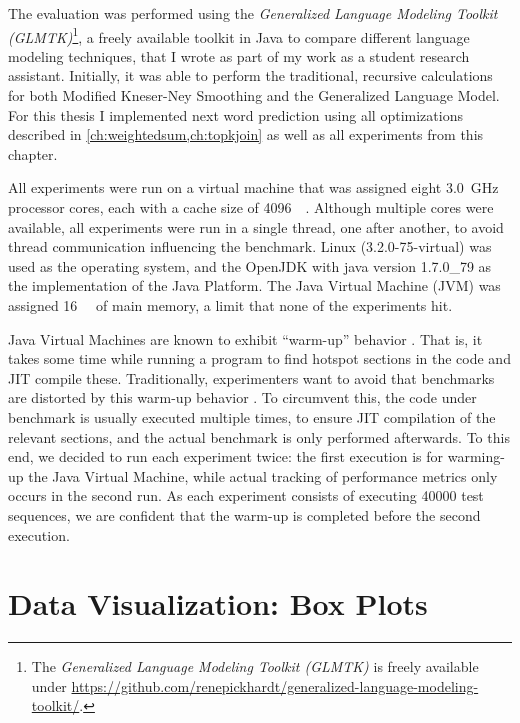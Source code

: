 The evaluation was performed using the \emph{Generalized Language Modeling
Toolkit (GLMTK)}\footnote{The \emph{Generalized Language Modeling Toolkit
(GLMTK)} is freely available under
\mbox{\url{https://github.com/renepickhardt/generalized-language-modeling-toolkit/}}.},
a freely available toolkit in Java to compare different language modeling
techniques, that I wrote as part of my work as a student research assistant.
Initially, it was able to perform the traditional, recursive calculations for
both Modified Kneser-Ney Smoothing and the Generalized Language Model.
For this thesis I implemented next word prediction using all optimizations
described in \cref{ch:weightedsum,ch:topkjoin} as well as all experiments from
this chapter.

All experiments were run on a virtual machine that was assigned eight
\SI{3.0}{\giga\hertz} processor cores, each with a cache size of
\SI{4096}{\kibi\byte}.
Although multiple cores were available, all experiments were run in a single
thread, one after another, to avoid thread communication influencing the
benchmark.
Linux (3.2.0-75-virtual) was used as the operating system, and
the OpenJDK with java version 1.7.0\_79 as the implementation of the
Java Platform.
The Java Virtual Machine (JVM) was assigned \SI{16}{\gibi\byte} of main memory,
a limit that none of the experiments hit.

Java Virtual Machines are known to exhibit \enquote{warm-up} behavior \noref.
That is, it takes some time while running a program to find hotspot sections
in the code and JIT compile these.
Traditionally, experimenters want to avoid that benchmarks are distorted by
this warm-up behavior \noref.
To circumvent this, the code under benchmark is usually executed multiple times,
to ensure JIT compilation of the relevant sections, and the actual benchmark
is only performed afterwards.
To this end, we decided to run each experiment twice:
the first execution is for warming-up the Java Virtual Machine, while actual
tracking of performance metrics only occurs in the second run.
As each experiment consists of executing \num{40000} test sequences, we are
confident that the warm-up is completed before the second execution.


\section{Data Visualization: Box Plots}
\label{sec:boxplot}

